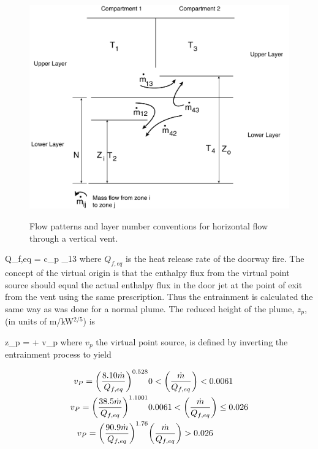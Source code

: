 \begin{figure}[t]
\begin{center}
\includegraphics[width=5.0in]{FIGURES/Theory/Flow_Patterns}\\
\end{center}
\caption{Flow patterns and layer number conventions for horizontal flow through a vertical vent.}
 \label{fig:Flow_Patterns}
\end{figure}

\be Q_{f,eq} = c_p  \dm_{13} \ee
where $Q_{f,eq}$ is the heat release rate of the doorway fire. The concept of the virtual origin is that the enthalpy flux from the virtual point source should equal the actual enthalpy flux in the door jet at the point of exit from the vent using the same prescription.  Thus the entrainment is calculated the same way as was done for a normal plume.  The reduced height of the plume, $z_p$, (in units of m/kW$^{2/5}$) is

\be z_p = + v_p \ee
where $v_p$ the virtual point source, is defined by inverting the entrainment process to yield

\begin{eqnarray}
v_P = \brackets{\frac{8.10 \dm}{Q_{f,eq}}}^{0.528} &   0 < \brackets{\frac{\dm}{Q_{f,eq}}} < 0.0061 \nonumber \\
v_P = \brackets{\frac{38.5 \dm}{Q_{f,eq}}}^{1.1001} & 0.0061 < \brackets{\frac{\dm}{Q_{f,eq}}} \leq 0.026 \\
 v_P = \brackets{\frac{90.9 \dm}{Q_{f,eq}}}^{1.76} & \brackets{\frac{\dm}{Q_{f,eq}}} > 0.026  \nonumber   \nopagebreak
\end{eqnarray}

